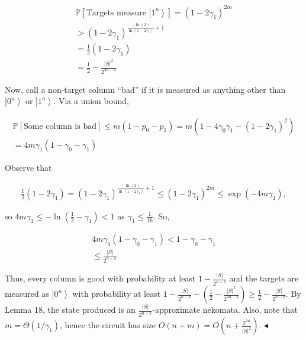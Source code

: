 \documentclass[10pt,a4paper]{article}
\begin{document}
\[\begin{gathered}
\displaystyle\mathbb{P}[\text{Targets measure }\left|1^{n}\right\rangle] \displaystyle=(1-2\gamma_{1})^{2m} \\
\displaystyle>(1-2\gamma_{1})^{\frac{-\ln(2)}{\ln(1-2\gamma_{1})}+1} \\
\displaystyle=\frac{1}{2}(1-2\gamma_{1}) \\
\displaystyle=\frac{1}{2}-\frac{|S|^{2}}{2^{2n-2}}
\end{gathered}\]


Now, call a non-target column “bad” if it is measured as anything other than $\left|0^{n}\right\rangle$ or $\left|1^{n}\right\rangle$. Via a union bound,\par


\[\begin{gathered}
\displaystyle\mathbb{P}[\text{Some column is bad}]\leq m(1-p_{0}-p_{1}) \displaystyle=m(1-4\gamma_{0}\gamma_{1}-(1-2\gamma_{1})^{2}) \\
\displaystyle=4m\gamma_{1}(1-\gamma_{0}-\gamma_{1})
\end{gathered}\]


Observe that\par


\[\begin{gathered}
\frac{1}{2}(1-2\gamma_{1})=(1-2\gamma_{1})^{\frac{-\ln(2)}{\ln(1-2\gamma_{1})}+1}\leq(1-2\gamma_{1})^{2m}\leq\exp(-4m\gamma_{1}),
\end{gathered}\]


so $4m\gamma_{1}\leq-\ln(\frac{1}{2}-\gamma_{1})<1$ as $\gamma_{1}\leq\frac{1}{16}$. So,\par


\[\begin{gathered}
\displaystyle 4m\gamma_{1}(1-\gamma_{0}-\gamma_{1}) \displaystyle<1-\gamma_{0}-\gamma_{1} \\
\displaystyle\leq\frac{|S|}{2^{n-2}}
\end{gathered}\]


Thus, every column is good with probability at least $1-\frac{|S|}{2^{n-2}}$ and the targets are measured as $\left|0^{n}\right\rangle$ with probability at least $1-\frac{|S|}{2^{n-2}}-(\frac{1}{2}-\frac{|S|^{2}}{2^{2n-2}})\geq\frac{1}{2}-\frac{|S|}{2^{n-2}}$. By Lemma 18, the state produced is an $\frac{|S|}{2^{n-3}}$-approximate nekomata. Also, note that $m=\Theta(1/\gamma_{1})$, hence the circuit has size $O(n+m)=O(n+\frac{2^{2n}}{|S|^{2}})$.
$\blacktriangleleft$\par
\end{document}
